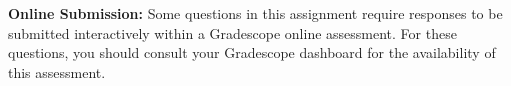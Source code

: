 \vspace{.25\baselineskip}


{\bf Online Submission:}
Some questions in this assignment require responses to be submitted interactively within a Gradescope online assessment. For these questions, you should consult your Gradescope dashboard for the availability of this assessment.




